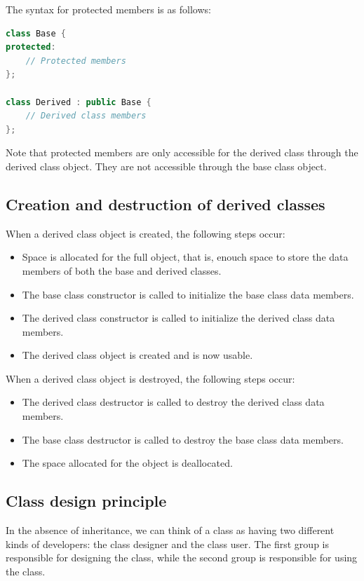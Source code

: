 The syntax for protected members is as follows:

\begin{lstlisting}[language=C++]
class Base {
protected:
    // Protected members
};

class Derived : public Base {
    // Derived class members
};
\end{lstlisting}

Note that protected members are only accessible for the derived class through the
derived class object. They are not accessible through the base class object.

\subsection{Creation and destruction of derived classes}

When a derived class object is created, the following steps occur:

\begin{itemize}
    \item Space is allocated for the full object, that is, enouch space to store the data
    members of both the base and derived classes.
    \item The base class constructor is called to initialize the base class data members.
    \item The derived class constructor is called to initialize the derived class data members.
    \item The derived class object is created and is now usable.
\end{itemize}

When a derived class object is destroyed, the following steps occur:

\begin{itemize}
    \item The derived class destructor is called to destroy the derived class data members.
    \item The base class destructor is called to destroy the base class data members.
    \item The space allocated for the object is deallocated.
\end{itemize}

\subsection{Class design principle}

In the absence of inheritance, we can think of a class as having two different kinds
of developers: the class designer and the class user. The first group is responsible
for designing the class, while the second group is responsible for using the class.\\

